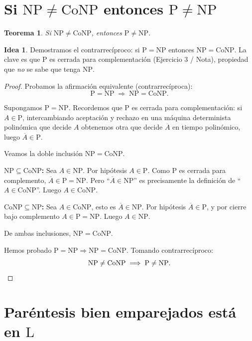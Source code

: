 \documentclass[11pt,a4paper]{article}
\theoremstyle{plain}
\newtheorem{teorema}{Teorema}
\theoremstyle{definition}
\newtheorem*{idea}{Idea}
\newcommand{\NP}{\mathrm{NP}}
\newcommand{\coNP}{\mathrm{CoNP}}
\newcommand{\Pclass}{\mathrm{P}}
\newcommand{\Lclass}{\mathrm{L}}
\begin{document}
\section{Si $\NP\neq\coNP$ entonces $\Pclass\neq\NP$}

\begin{teorema}
Si $\NP\neq\coNP$, entonces $\Pclass\neq\NP$.
\end{teorema}

\begin{idea}
Demostramos el contrarrec\'iproco: si $\Pclass=\NP$ entonces $\NP=\coNP$. La clave es
que $\Pclass$ es cerrada para complementaci\'on (Ejercicio 3 / Nota), propiedad que
\emph{no} se sabe que tenga $\NP$.
\end{idea}

\begin{proof}
Probamos la afirmaci\'on equivalente (contrarrec\'iproca):
\[
\Pclass=\NP \;\Longrightarrow\; \NP=\coNP .
\]

Supongamos $\Pclass=\NP$. Recordemos que $\Pclass$ es cerrada para complementaci\'on:
si $A\in\Pclass$, intercambiando aceptaci\'on y rechazo en una m\'aquina
determinista polin\'omica que decide $A$ obtenemos otra que decide $\overline{A}$ en
tiempo polin\'omico, luego $\overline{A}\in\Pclass$.

Veamos la doble inclusi\'on $\NP=\coNP$.

\textbf{$\NP\subseteq\coNP$:} Sea $A\in\NP$. Por hip\'otesis $A\in\Pclass$. Como
$\Pclass$ es cerrada para complemento, $\overline{A}\in\Pclass=\NP$. Pero
``$\overline{A}\in\NP$'' es precisamente la definici\'on de ``$A\in\coNP$''. Luego
$A\in\coNP$.

\textbf{$\coNP\subseteq\NP$:} Sea $A\in\coNP$, esto es $\overline{A}\in\NP$. Por
hip\'otesis $\overline{A}\in\Pclass$, y por cierre bajo complemento
$A\in\Pclass=\NP$. Luego $A\in\NP$.

De ambas inclusiones, $\NP=\coNP$.

Hemos probado $\Pclass=\NP\Rightarrow\NP=\coNP$. Tomando contrarrec\'iproco:
\[
\NP\neq\coNP \;\Longrightarrow\; \Pclass\neq\NP. \qedhere
\]
\end{proof}

\section{Par\'entesis bien emparejados est\'a en $\Lclass$}
\end{document}
